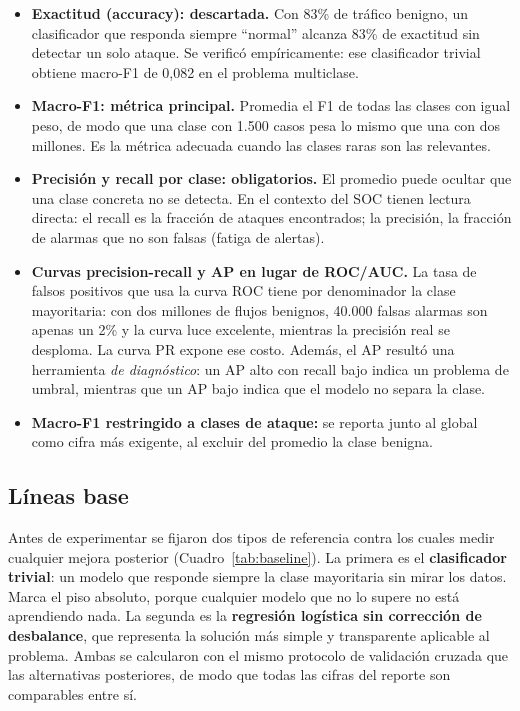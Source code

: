 \documentclass[11pt,a4paper]{article}
\begin{document}
\begin{itemize}
\item \textbf{Exactitud (accuracy): descartada.} Con 83\% de tráfico benigno,
un clasificador que responda siempre ``normal'' alcanza 83\% de exactitud sin
detectar un solo ataque. Se verificó empíricamente: ese clasificador trivial
obtiene macro-F1 de 0,082 en el problema multiclase.
\item \textbf{Macro-F1: métrica principal.} Promedia el F1 de todas las
clases con igual peso, de modo que una clase con 1.500 casos pesa lo mismo
que una con dos millones. Es la métrica adecuada cuando las clases raras son
las relevantes.
\item \textbf{Precisión y recall por clase: obligatorios.} El promedio puede
ocultar que una clase concreta no se detecta. En el contexto del SOC tienen
lectura directa: el recall es la fracción de ataques encontrados; la
precisión, la fracción de alarmas que no son falsas (fatiga de alertas).
\item \textbf{Curvas precision-recall y AP en lugar de ROC/AUC.} La tasa de
falsos positivos que usa la curva ROC tiene por denominador la clase
mayoritaria: con dos millones de flujos benignos, 40.000 falsas alarmas son
apenas un 2\% y la curva luce excelente, mientras la precisión real se
desploma. La curva PR expone ese costo. Además, el AP resultó una herramienta
\emph{de diagnóstico}: un AP alto con recall bajo indica un problema de
umbral, mientras que un AP bajo indica que el modelo no separa la clase.
\item \textbf{Macro-F1 restringido a clases de ataque:} se reporta junto al
global como cifra más exigente, al excluir del promedio la clase benigna.
\end{itemize}

\subsection{Líneas base}

Antes de experimentar se fijaron dos tipos de referencia contra los cuales
medir cualquier mejora posterior (Cuadro~\ref{tab:baseline}). La primera es el
\textbf{clasificador trivial}: un modelo que responde siempre la clase
mayoritaria sin mirar los datos. Marca el piso absoluto, porque cualquier
modelo que no lo supere no está aprendiendo nada. La segunda es la
\textbf{regresión logística sin corrección de desbalance}, que representa la
solución más simple y transparente aplicable al problema. Ambas se calcularon
con el mismo protocolo de validación cruzada que las alternativas posteriores,
de modo que todas las cifras del reporte son comparables entre sí.
\end{document}
